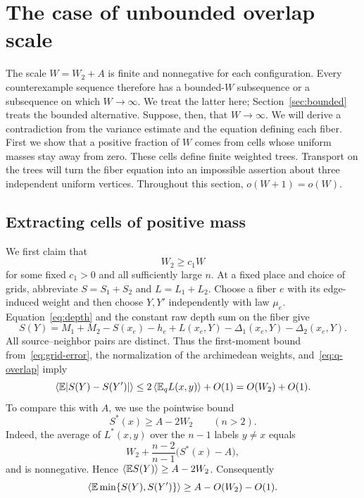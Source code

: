 \section{The case of unbounded overlap scale}\label{sec:unbounded}

The scale $W=W_2+A$ is finite and nonnegative for each configuration.
Every counterexample sequence therefore has a bounded-$W$ subsequence
or a subsequence on which $W\to\infty$. We treat the latter here;
Section~\ref{sec:bounded} treats the bounded alternative.
Suppose, then, that $W\to\infty$. We will derive a
contradiction from the variance estimate and the equation defining each
fiber. First we show that a positive fraction of $W$ comes from cells
whose uniform masses stay away from zero. These cells define finite
weighted trees. Transport on the trees will turn the fiber equation into
an impossible assertion about three independent uniform vertices.
Throughout this section, $o(W+1)=o(W)$.

\subsection{Extracting cells of positive mass}

We first claim that
\begin{equation}\label{eq:unb-overlap-scale}
 W_2\ge c_1 W
\end{equation}
for some fixed $c_1>0$ and all sufficiently large $n$. At a fixed
place and choice of grids, abbreviate $S=S_1+S_2$ and $L=L_1+L_2$.
Choose a fiber $e$ with its edge-induced weight and then choose $Y,Y'$
independently with law $\mu_e$. Equation~\eqref{eq:depth} and the
constant raw depth sum on the fiber give
\[
 S(Y)=M_1+M_2-S(x_e)-h_e+L(x_e,Y)
       -\Delta_1(x_e,Y)-\Delta_2(x_e,Y).
\]
All source--neighbor pairs are distinct. Thus the first-moment bound
from~\eqref{eq:grid-error}, the normalization of the archimedean
weights, and~\eqref{eq:q-overlap} imply
\[
 \left\langle \mathbb E|S(Y)-S(Y')|\right\rangle\le 2\left\langle \mathbb E_q L(x,y)\right\rangle+O(1)
 =O(W_2)+O(1).
\]
To compare this with $A$, we use the pointwise bound
\begin{equation}\label{eq:potential}
 S^*(x)\ge A-2W_2\qquad(n>2).
\end{equation}
Indeed, the average of $L^*(x,y)$ over the $n-1$ labels $y\ne x$ equals
\[
 W_2+\frac{n-2}{n-1}\bigl(S^*(x)-A\bigr),
\]
and is nonnegative.  Hence $\left\langle \mathbb E S(Y)\right\rangle\ge A-2W_2$.
Consequently
\begin{equation}\label{eq:unb-min-lower}
 \left\langle \mathbb E\min\{S(Y),S(Y')\}\right\rangle\ge A-O(W_2)-O(1).
\end{equation}

